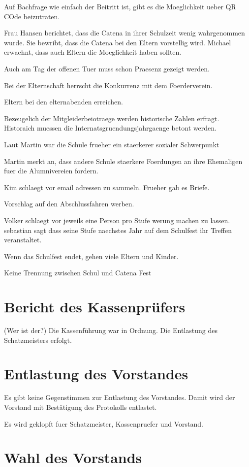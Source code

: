 \documentclass[a4paper, 11pt]{article}
\begin{document}
Auf Bachfrage wie einfach der Beitritt ist, gibt es die Moeglichkeit ueber QR COde beizutraten.

Frau Hansen berichtet, dass die Catena in ihrer Schulzeit wenig wahrgenommen wurde.
Sie bewribt, dass die Catena bei den Eltern vorstellig wird.
Michael erwaehnt, dass auch Eltern die Moeglichkeit haben sollten.

Auch am Tag der offenen Tuer muss schon Praesenz gezeigt werden.

Bei der Elternschaft herrscht die Konkurrenz mit dem Foerderverein.

Eltern bei den elternabenden erreichen.

Bezeugelich der Mitgleiderbeiotraege werden historische Zahlen erfragt.
Historaich muessen die Internatsgruendungsjahrgaenge betont werden.

Laut Martin war die Schule frueher ein staerkerer sozialer Schwerpunkt

Martin merkt an, dass andere Schule staerkere Foerdungen an ihre Ehemaligen fuer die Alumnivereien fordern.

Kim schlaegt vor email adressen zu sammeln. Frueher gab es Briefe.

Vorschlag auf den Abschlussfahren werben.

Volker schlaegt vor jeweils eine Person pro Stufe werung machen zu lassen.
sebastian sagt dass seine Stufe naechstes Jahr auf dem Schulfest ihr Treffen veranstaltet.

Wenn das Schulfest endet, gehen viele Eltern und Kinder.

Keine Trennung zwischen Schul und Catena Fest

\section*{Bericht des Kassenprüfers}

(Wer ist der?)
Die Kassenführung war in Ordnung.
Die Entlastung des Schatzmeisters erfolgt.

\section*{Entlastung des Vorstandes}

Es gibt keine Gegenstimmen zur Entlastung des Vorstandes. Damit wird der Vorstand mit Bestätigung des Protokolls entlastet.

Es wird geklopft fuer Schatzmeister, Kassenpruefer und Vorstand.

\section*{Wahl des Vorstands}
\end{document}
